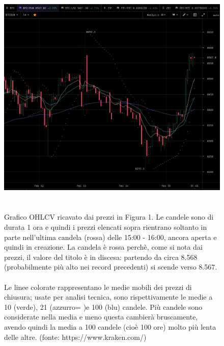 \documentclass{article}
\numberwithin{equation}{section}
\begin{document}
		\begin{figure}
		\begin{center}
		\includegraphics[width=\linewidth]{kraken_ohlcv}
		\caption{\\~\\Grafico OHLCV ricavato dai prezzi in Figura 1. Le candele sono di durata 1 ora e quindi i prezzi elencati sopra rientrano soltanto in parte nell'ultima candela (rossa) delle 15:00 - 16:00, ancora aperta e quindi in creazione. La candela è rossa perchè, come si nota dai prezzi, il valore del titolo  è in discesa: partendo da circa 8.568 (probabilmente più alto nei record precedenti) si scende verso 8.567.\\~\\Le linee colorate rappresentano le medie mobili dei prezzi di chiusura; usate per analisi tecnica, sono rispettivamente le medie a 10 (verde), 21 (azzurro= )e 100 (blu) candele. Più candele sono considerate nella media e meno questa cambierà bruscamente, avendo quindi la media a 100 candele (cioè 100 ore) molto più lenta delle altre. (fonte: https://www.kraken.com/)}
		\end{center}
		\end{figure}

		\\~\\		
\end{document}
